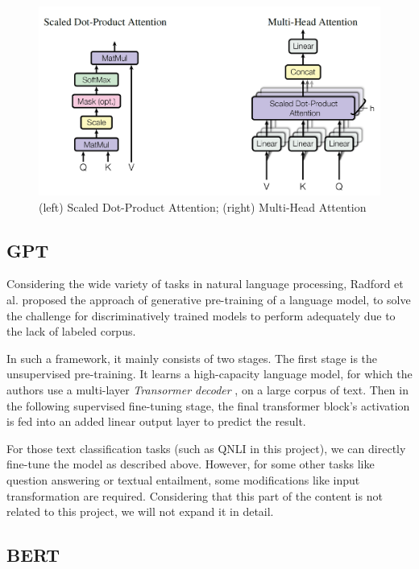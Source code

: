 \documentclass[10pt,journal,compsoc]{IEEEtran}
\begin{document}
\begin{figure}[!t]
  \centering
  \includegraphics[width=1\linewidth]{images/transformer_attention.png}
  \caption{(left) Scaled Dot-Product Attention; (right) Multi-Head Attention}
  \label{fig:transformer_attention}
\end{figure}

\subsection{GPT}
\label{subsec:gpt}

Considering the wide variety of tasks in natural language processing, Radford et al. \cite{radford2018improving} proposed the approach of generative pre-training of a language model, to solve the challenge for discriminatively trained models to perform adequately due to the lack of labeled corpus.

In such a framework, it mainly consists of two stages. The first stage is the unsupervised pre-training. It learns a high-capacity language model, for which the authors use a multi-layer \emph{Transormer decoder} \cite{liu2018generating}, on a large corpus of text. Then in the following supervised fine-tuning stage, the final transformer block's activation is fed into an added linear output layer to predict the result.

For those text classification tasks (such as QNLI in this project), we can directly fine-tune the model as described above. However, for some other tasks like question answering or textual entailment, some modifications like input transformation are required. Considering that this part of the content is not related to this project, we will not expand it in detail.

\subsection{BERT}
\label{subsec:bert}
\end{document}
